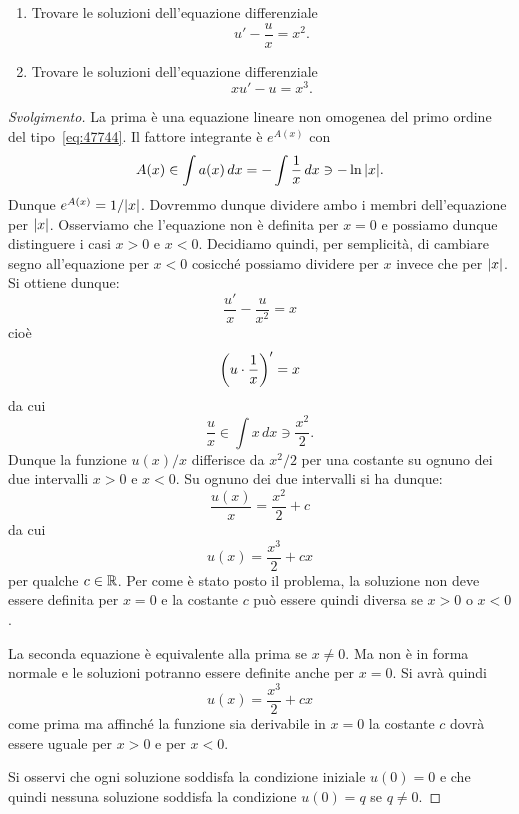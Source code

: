 \begin{exercise}
\begin{enumerate}
\item
Trovare le soluzioni dell'equazione differenziale
\[
  u' - \frac{u}{x} = x^2.
\]

\item
Trovare le soluzioni dell'equazione differenziale
\[
  x u' - u = x^3.
\]
\end{enumerate}
\end{exercise}
\begin{proof}[Svolgimento]
La prima è una equazione lineare non omogenea del primo ordine
del tipo~\eqref{eq:47744}. Il fattore integrante è $e^{A(x)}$ con
\[
  A(x) \in \int a(x)\, dx = -\int \frac{1}{x}\, dx \ni - \ln {\left|x\right|}.
\]
Dunque $e^{A(x)} = 1/{\left|x\right|}$. Dovremmo dunque dividere ambo i membri dell'equazione per ${\left|x\right|}$. Osserviamo che l'equazione non è definita per $x=0$ e possiamo dunque distinguere i casi $x>0$ e $x<0$. Decidiamo quindi, per semplicità, di cambiare segno all'equazione per $x<0$ cosicché possiamo dividere per $x$ invece che per ${\left|x\right|}$.
Si ottiene dunque:
\[
  \frac{u'}{x} - \frac{u}{x^2} = x
\]
cioè
\[
  {\left( u\cdot \frac{1}{x} \right)}'  = x
\]
da cui
\[
  \frac{u}{x} \in \int x\, dx \ni \frac{x^2}{2}.
\]
Dunque la funzione $u(x)/x$ differisce da $x^2/2$ per una costante su ognuno dei due intervalli $x>0$ e $x<0$. Su ognuno dei due intervalli si ha dunque:
\[
  \frac{u(x)}{x} = \frac{x^2}{2} + c
\]
da cui
\[
  u(x) = \frac{x^3}{2} + c x
\]
per qualche $c\in \mathbb R$. Per come è stato posto il problema, la soluzione non deve essere definita per $x=0$ e la costante $c$ può essere quindi diversa se $x>0$ o $x<0$.

La seconda equazione è equivalente alla prima se $x\neq 0$. Ma non è in forma normale e le soluzioni
potranno essere definite anche per $x=0$.
Si avrà quindi
\[
  u(x) = \frac{x^3}{2} + c x
\]
come prima ma affinché la funzione sia derivabile in $x=0$ la costante $c$ dovrà essere uguale per $x>0$ e per $x<0$.

Si osservi che ogni soluzione soddisfa la condizione iniziale $u(0) = 0$ e che quindi nessuna soluzione soddisfa la condizione $u(0)= q$ se $q \neq 0$.
\end{proof}

